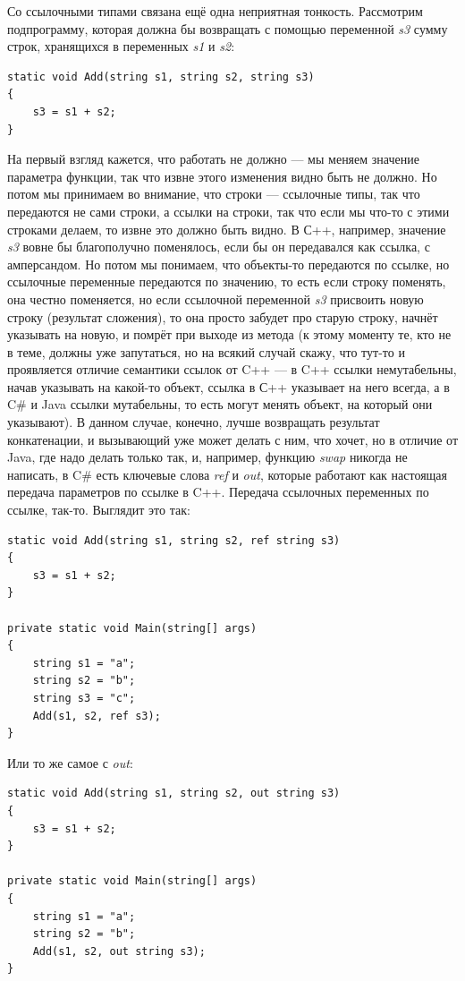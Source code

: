 \documentclass[a5paper]{article}
\begin{document}
Со ссылочными типами связана ещё одна неприятная тонкость. Рассмотрим подпрограмму, которая должна бы возвращать с помощью переменной \textit{s3} сумму строк, хранящихся в переменных \textit{s1} и \textit{s2}:

\begin{verbatim}
static void Add(string s1, string s2, string s3)
{
    s3 = s1 + s2;
}
\end{verbatim}

На первый взгляд кажется, что работать не должно --- мы меняем значение параметра функции, так что извне этого изменения видно быть не должно. Но потом мы принимаем во внимание, что строки --- ссылочные типы, так что передаются не сами строки, а ссылки на строки, так что если мы что-то с этими строками делаем, то извне это должно быть видно. В С++, например, значение \textit{s3} вовне бы благополучно поменялось, если бы он передавался как ссылка, с амперсандом. Но потом мы понимаем, что объекты-то передаются по ссылке, но ссылочные переменные передаются по значению, то есть если строку поменять, она честно поменяется, но если ссылочной переменной \textit{s3} присвоить новую строку (результат сложения), то она просто забудет про старую строку, начнёт указывать на новую, и помрёт при выходе из метода (к этому моменту те, кто не в теме, должны уже запутаться, но на всякий случай скажу, что тут-то и проявляется отличие семантики ссылок от C++ --- в C++ ссылки немутабельны, начав указывать на какой-то объект, ссылка в С++ указывает на него всегда, а в C\# и Java ссылки мутабельны, то есть могут менять объект, на который они указывают). В данном случае, конечно, лучше возвращать результат конкатенации, и вызывающий уже может делать с ним, что хочет, но в отличие от Java, где надо делать только так, и, например, функцию \textit{swap} никогда не написать, в C\# есть ключевые слова \textit{ref} и \textit{out}, которые работают как настоящая передача параметров по ссылке в C++. Передача ссылочных переменных по ссылке, так-то. Выглядит это так:

\begin{verbatim}
static void Add(string s1, string s2, ref string s3)
{
    s3 = s1 + s2;
}

private static void Main(string[] args)
{
    string s1 = "a";
    string s2 = "b";
    string s3 = "c";
    Add(s1, s2, ref s3);
}
\end{verbatim}

Или то же самое с \textit{out}:

\begin{verbatim}
static void Add(string s1, string s2, out string s3)
{
    s3 = s1 + s2;
}

private static void Main(string[] args)
{
    string s1 = "a";
    string s2 = "b";
    Add(s1, s2, out string s3);
}
\end{verbatim}
\end{document}

